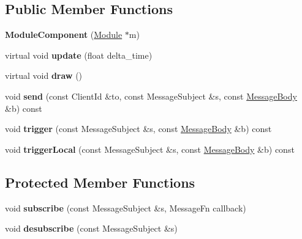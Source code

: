 \subsection*{Public Member Functions}
\begin{DoxyCompactItemize}
\item 
\mbox{\label{classTarbora_1_1ModuleComponent_abf895d50857190a19b6879aeecc21668}} 
{\bfseries Module\+Component} (\hyperlink{classTarbora_1_1Module}{Module} $\ast$m)
\item 
\mbox{\label{classTarbora_1_1ModuleComponent_aedb5e8927d2b169c89bb2d5b85bb205b}} 
virtual void {\bfseries update} (float delta\+\_\+time)
\item 
\mbox{\label{classTarbora_1_1ModuleComponent_adac1428851fc4c3b84fbda5fa81326f0}} 
virtual void {\bfseries draw} ()
\item 
\mbox{\label{classTarbora_1_1ModuleComponent_a6b71373206a4a74318e5214bd8baf833}} 
void {\bfseries send} (const Client\+Id \&to, const Message\+Subject \&s, const \hyperlink{classTarbora_1_1MessageBody}{Message\+Body} \&b) const
\item 
\mbox{\label{classTarbora_1_1ModuleComponent_a9bfd9e0688f15c8c957d7e6b4aa55e02}} 
void {\bfseries trigger} (const Message\+Subject \&s, const \hyperlink{classTarbora_1_1MessageBody}{Message\+Body} \&b) const
\item 
\mbox{\label{classTarbora_1_1ModuleComponent_a352f36fb03dbcf383c4485a463515292}} 
void {\bfseries trigger\+Local} (const Message\+Subject \&s, const \hyperlink{classTarbora_1_1MessageBody}{Message\+Body} \&b) const
\end{DoxyCompactItemize}
\subsection*{Protected Member Functions}
\begin{DoxyCompactItemize}
\item 
\mbox{\label{classTarbora_1_1ModuleComponent_a6b782690dc2819a2ba06ad72a64ee419}} 
void {\bfseries subscribe} (const Message\+Subject \&s, Message\+Fn callback)
\item 
\mbox{\label{classTarbora_1_1ModuleComponent_a06628e8d630f575630d88fe33815a9ed}} 
void {\bfseries desubscribe} (const Message\+Subject \&s)
\end{DoxyCompactItemize}
